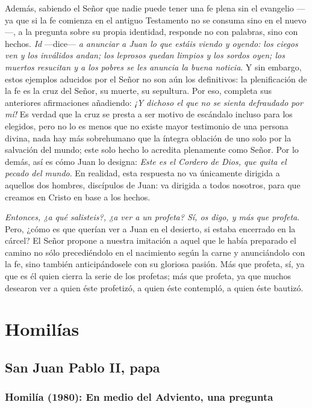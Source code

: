 Además, sabiendo el Señor que nadie puede tener una fe plena sin el evangelio ---ya que si la fe comienza en el antiguo Testamento no se consuma sino en el nuevo---, a la pregunta sobre su propia identidad, responde no con palabras, sino con hechos. \emph{Id} ---dice--- \emph{a anunciar a Juan lo que estáis viendo y oyendo: los ciegos ven y los inválidos andan; los leprosos quedan limpios y los sordos oyen; los muertos resucitan y a los pobres se les anuncia la buena noticia}. Y sin embargo, estos ejemplos aducidos por el Señor no son aún los definitivos: la plenificación de la fe es la cruz del Señor, su muerte, su sepultura. Por eso, completa sus anteriores afirmaciones añadiendo: \emph{¡Y dichoso el que no se sienta defraudado por mí!} Es verdad que la cruz se presta a ser motivo de escándalo incluso para los elegidos, pero no lo es menos que no existe mayor testimonio de una persona divina, nada hay más sobrehumano que la íntegra oblación de uno solo por la salvación del mundo; este solo hecho lo acredita plenamente como Señor. Por lo demás, así es cómo Juan lo designa: \emph{Este es el Cordero de Dios, que quita el pecado del mundo}. En realidad, esta respuesta no va únicamente dirigida a aquellos dos hombres, discípulos de Juan: va dirigida a todos nosotros, para que creamos en Cristo en base a los hechos.

\emph{Entonces, ¿a qué salisteis?, ¿a ver a un profeta? Sí, os digo, y más que profeta}. Pero, ¿cómo es que querían ver a Juan en el desierto, si estaba encerrado en la cárcel? El Señor propone a nuestra imitación a aquel que le había preparado el camino no sólo precediéndolo en el nacimiento según la carne y anunciándolo con la fe, sino también anticipándosele con su gloriosa pasión. Más que profeta, sí, ya que es él quien cierra la serie de los profetas; más que profeta, ya que muchos desearon ver a quien éste profetizó, a quien éste contempló, a quien éste bautizó.

\section{Homilías}

\subsection{San Juan Pablo II, papa}

\subsubsection{Homilía (1980): En medio del Adviento, una pregunta}

